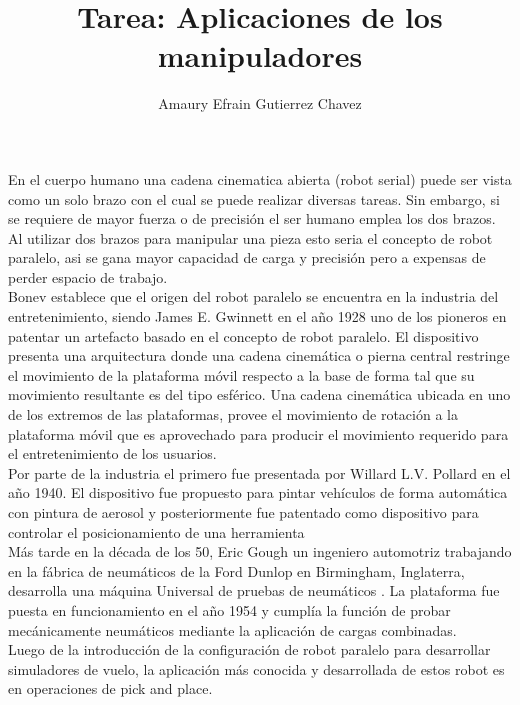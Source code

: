 \documentclass[12pt,a4paper]{article}
\title{Tarea: Aplicaciones de los manipuladores  }
\author{Amaury Efrain Gutierrez Chavez}
\begin{document}
\maketitle
En el cuerpo humano una cadena cinematica abierta (robot serial) puede ser vista como un solo brazo con el cual se puede realizar diversas tareas. Sin embargo, si se requiere de mayor fuerza o de precisión el ser humano emplea los dos brazos. Al utilizar dos brazos para manipular una pieza esto seria el concepto de robot paralelo, asi se gana mayor capacidad de carga y precisión pero a expensas de perder espacio de trabajo.\\
Bonev establece que el origen del robot paralelo se encuentra en la industria del entretenimiento, siendo James E. Gwinnett en el año 1928 uno de los pioneros en patentar un artefacto basado en el concepto de robot paralelo. El dispositivo 
presenta una arquitectura donde una cadena cinemática o pierna central restringe el movimiento de la plataforma móvil respecto a la base de forma tal que su movimiento resultante es del tipo esférico. Una cadena cinemática ubicada en uno de los extremos de las plataformas, provee el movimiento de rotación a la plataforma móvil que es aprovechado para producir el movimiento requerido para el entretenimiento de los usuarios.\\

Por parte de la industria el primero fue presentada por Willard L.V. Pollard en el año 1940. El dispositivo fue propuesto para pintar vehículos de forma automática con pintura de aerosol y posteriormente fue patentado como dispositivo para controlar el posicionamiento de una herramienta\\
Más tarde en la década de los 50, Eric Gough un ingeniero automotriz trabajando en la fábrica de neumáticos de la Ford Dunlop en Birmingham, Inglaterra, desarrolla una máquina Universal de pruebas de neumáticos . La plataforma fue puesta en funcionamiento en el año 1954 y cumplía la función de probar mecánicamente neumáticos mediante la aplicación de cargas combinadas.\\
Luego de la introducción de la configuración de robot paralelo para desarrollar simuladores de vuelo, la aplicación más conocida y desarrollada de estos robot es en operaciones de pick and place.\\
\end{document}
